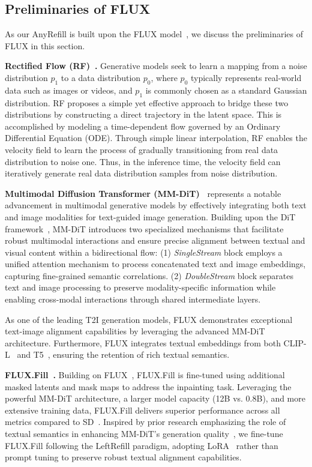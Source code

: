 \subsection{Preliminaries of FLUX}
\label{sec:preliminary_anyrefill}

As our AnyRefill is built upon the FLUX model~\cite{flux2024}, we discuss the preliminaries of FLUX in this section.

\noindent\textbf{Rectified Flow (RF)~\cite{liu2022flow}.}
Generative models seek to learn a mapping from a noise distribution \( p_1 \) to a data distribution \( p_0 \), where \( p_0 \) typically represents real-world data such as images or videos, and \( p_1 \) is commonly chosen as a standard Gaussian distribution. RF proposes a simple yet effective approach to bridge these two distributions by constructing a direct trajectory in the latent space. This is accomplished by modeling a time-dependent flow governed by an Ordinary Differential Equation (ODE). Through simple linear interpolation, RF enables the velocity field to learn the process of gradually transitioning from real data distribution to noise one. Thus, in the inference time, the velocity field can iteratively generate real data distribution samples from noise distribution.


\noindent\textbf{Multimodal Diffusion Transformer (MM-DiT)~\cite{esser2024scaling}}
represents a notable advancement in multimodal generative models by effectively integrating both text and image modalities for text-guided image generation. 
Building upon the DiT framework~\cite{peebles2023scalable}, MM-DiT introduces two specialized mechanisms that facilitate robust multimodal interactions and ensure precise alignment between textual and visual content within a bidirectional flow: (1) \textit{SingleStream} block employs a unified attention mechanism to process concatenated text and image embeddings, capturing fine-grained semantic correlations. (2) \textit{DoubleStream} block separates text and image processing to preserve modality-specific information while enabling cross-modal interactions through shared intermediate layers.

As one of the leading T2I generation models, FLUX demonstrates exceptional text-image alignment capabilities by leveraging the advanced MM-DiT architecture. Furthermore, FLUX integrates textual embeddings from both CLIP-L~\cite{radford2021learning} and T5~\cite{raffel2020exploring}, ensuring the retention of rich textual semantics.


\noindent\textbf{FLUX.Fill~\cite{fluxfill2024}.}
Building on FLUX~\cite{flux2024}, FLUX.Fill is fine-tuned using additional masked latents and mask maps to address the inpainting task. Leveraging the powerful MM-DiT architecture, a larger model capacity (12B vs. 0.8B), and more extensive training data, FLUX.Fill delivers superior performance across all metrics compared to SD~\cite{rombach2022high}.
Inspired by prior research emphasizing the role of textual semantics in enhancing MM-DiT's generation quality~\cite{esser2024scaling,ramesh2021zero,saharia2022photorealistic}, we fine-tune FLUX.Fill following the LeftRefill paradigm, adopting LoRA~\cite{hu2021lora} rather than prompt tuning to preserve robust textual alignment capabilities.